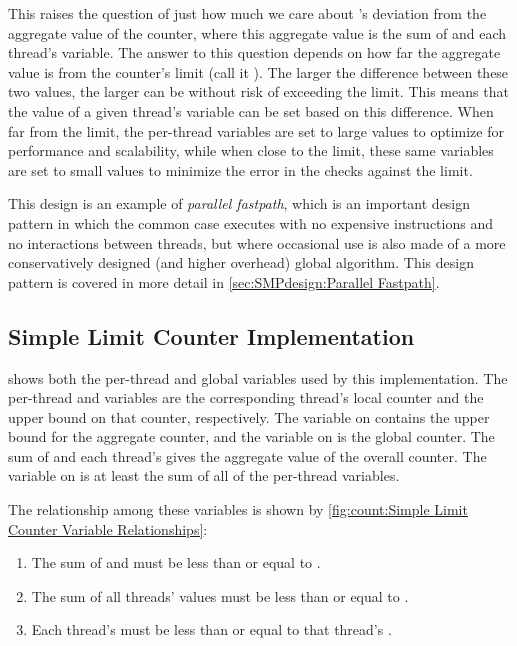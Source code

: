 This raises the question of just how much we care about 's
deviation from the aggregate value of the counter, where this aggregate value
is the sum of  and each thread's  variable.
The answer to this question depends on how far the aggregate value is
from the counter's limit (call it ).
The larger the difference between these two values, the larger 
can be without risk of exceeding the  limit.
This means that the
value of a given thread's  variable can be set
based on this difference.
When far from the limit, the  per-thread variables are
set to large values to optimize for performance and scalability, while
when close to the limit, these same variables are set to small values
to minimize the error in the checks against the  limit.

This design is an example of \emph{parallel fastpath}, which is an important
design pattern in which the common case executes with no expensive
instructions and no interactions between threads, but where occasional
use is also made of a more conservatively designed
(and higher overhead) global algorithm.
This design pattern is covered in more detail in
\cref{sec:SMPdesign:Parallel Fastpath}.

\subsection{Simple Limit Counter Implementation}
\label{sec:count:Simple Limit Counter Implementation}

\begin{fcvref}
shows both the per-thread and global variables used by this
implementation.
The per-thread  and  variables are the
corresponding thread's local counter and the upper bound on that
counter, respectively.
The  variable on
 contains the upper
bound for the aggregate counter, and the  variable
on  is the global counter.
The sum of  and each thread's  gives
the aggregate value of the overall counter.
The  variable on
 is at least the sum of all of the
per-thread  variables.
\end{fcvref}
The relationship among these variables is shown by
\cref{fig:count:Simple Limit Counter Variable Relationships}:
\begin{enumerate}
\item	The sum of  and  must
	be less than or equal to .
\item	The sum of all threads'  values must be
	less than or equal to .
\item	Each thread's  must be less than or equal to
	that thread's .
\end{enumerate}

